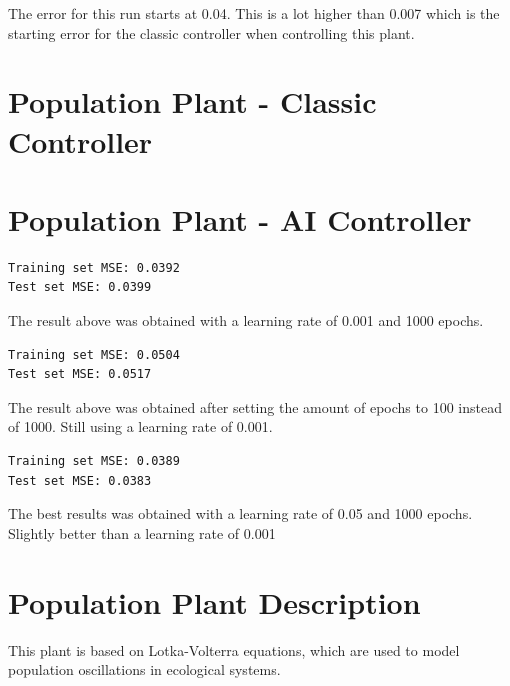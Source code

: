 \documentclass[12pt]{article}
\begin{document}
The error for this run starts at 0.04. This is a lot higher than 0.007 which is the starting error for the classic
controller when controlling this plant.

\section*{Population Plant - Classic Controller}

\section*{Population Plant - AI Controller}




\begin{verbatim}
Training set MSE: 0.0392
Test set MSE: 0.0399
\end{verbatim}

The result above was obtained with a learning rate of 0.001 and 1000 epochs. 

\begin{verbatim}
Training set MSE: 0.0504
Test set MSE: 0.0517
\end{verbatim}

The result above was obtained after setting the amount of epochs to 100 instead of 1000. Still using a learning rate of 0.001.

\begin{verbatim}
Training set MSE: 0.0389
Test set MSE: 0.0383
\end{verbatim}

The best results was obtained with a learning rate of 0.05 and 1000 epochs. Slightly better than a learning rate of
0.001

\section*{Population Plant Description}

This plant is based on Lotka-Volterra equations, which are used to model population oscillations in ecological systems.


\printbibliography
\end{document}
